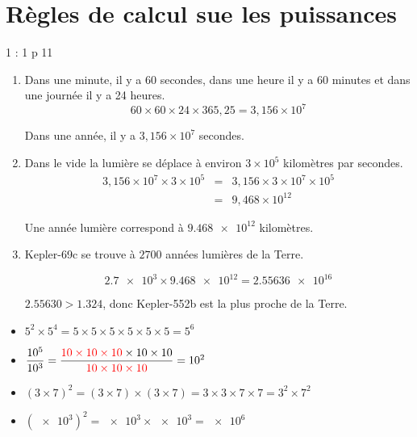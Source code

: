 \documentclass[12pt,a4paper]{article}
\date{}
\title{}
\begin{document}




\section{Règles de calcul sue les puissances}

\begin{myact}{1 : 1 p 11}
	 
	\begin{enumerate}[label=\alph*. ]
		\item Dans une minute, il y a 60 secondes, dans une heure il y a 60 minutes et dans une journée il y a 24 heures.
			\begin{equation*}
				60 \times 60 \times 24 \times 365,25 = 3,156 \times 10^7
			\end{equation*}
			
			Dans une année, il y a $3,156 \times 10^7$ secondes.
		
		\item Dans le vide la lumière se déplace à environ $3 \times 10^5$ kilomètres par secondes. 
			\begin{eqnarray*}
				3,156 \times 10^7 \times 3 \times 10^5 &=& 3,156 \times 3 \times 10^7 \times 10^5 \\
														&=& 9,468 \times 10^{12}
			\end{eqnarray*}
			
			Une année lumière correspond à $ \num{9.468 e12}$ kilomètres.
			
		\item Kepler-69c se trouve à $\num{2 700}$ années lumières de la Terre.
		
		\begin{equation*}
			\num{2.7 e3} \times \num{9.468 e12} = \num{2.55636 e16}
		\end{equation*}
		
		$\num{2.55630} > \num{1.324}$, donc Kepler-552b est la plus proche de la Terre.
	\end{enumerate}
		
		
\end{myact}

\begin{myex}
	\begin{itemize}
		\item $5^2 \times 5^4 = 5 \times 5 \times 5 \times 5 \times 5 \times 5 = 5^6$
		\item $\dfrac{\num{e5}}{\num{e3}} = \dfrac{\textcolor{red}{ 10 \times 10 \times 10} \times 10 \times 10}{\textcolor{red}{10 \times 10 \times 10}} = \num{e2}$
		\item $(3 \times 7)^2 = (3 \times 7) \times (3 \times 7) = 3 \times 3 \times 7 \times 7 = 3^2 \times 7^2$
		\item $(\num{e3})^2 = \num{e3} \times \num{e3} = \num{e6}$
	\end{itemize}
\end{myex}
	
\end{document}
